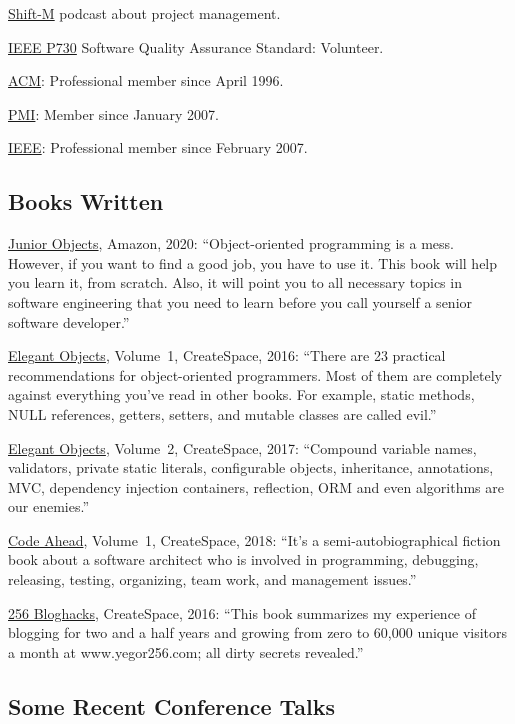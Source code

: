 \documentclass{yb}
\begin{document}
\href{https://www.yegor256.com/shift-m.html}{Shift-M} podcast about project management.

\href{http://ieeexplore.ieee.org/document/6835311/}{IEEE P730} Software Quality Assurance Standard: Volunteer.

\href{https://www.acm.org}{ACM}: Professional member since April 1996.

\href{https://certification.pmi.org/registry.aspx}{PMI}: Member since January 2007.

\href{https://www.ieee.org}{IEEE}: Professional member since February 2007.

\subsection*{Books Written}

\href{https://amzn.to/2u9BbqF}{Junior Objects}, Amazon, 2020:
``Object-oriented programming is a mess. However,
if you want to find a good job, you have to use it.
This book will help you learn it, from scratch.
Also, it will point you to all necessary topics
in software engineering that you need to learn before
you call yourself a senior software developer.''

\href{https://amzn.to/2E5UHqZ}{Elegant Objects}, Volume~1, CreateSpace, 2016:
``There are 23 practical recommendations for object-oriented programmers. Most of them are completely
against everything you've read in other books.
For example, static methods, NULL references, getters, setters, and
mutable classes are called evil.''

\href{https://amzn.to/2J2s5T4}{Elegant Objects}, Volume~2, CreateSpace, 2017:
``Compound variable names, validators, private static literals, configurable objects, inheritance,
annotations, MVC, dependency injection containers, reflection, ORM and even algorithms are our enemies.''

\href{https://amzn.to/2u9BbqF}{Code Ahead}, Volume~1, CreateSpace, 2018:
``It's a semi-autobiographical fiction book about a software architect
who is involved in programming, debugging, releasing, testing,
organizing, team work, and management issues.''

\href{https://amzn.to/2GkuyXf}{256 Bloghacks}, CreateSpace, 2016:
``This book summarizes my experience of blogging for two and a half years and growing from zero to 60,000
unique visitors a month at www.yegor256.com; all dirty secrets revealed.''

\subsection*{Some Recent Conference Talks}
\end{document}
